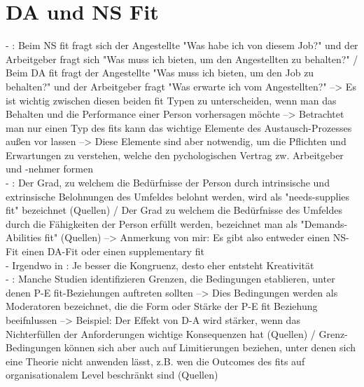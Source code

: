 \section{DA und NS Fit}
\label{ch:personEnvironmentFit:DAundNS}
- \cite[S. 3]{caplan:1987}: Beim NS fit fragt sich der Angestellte "Was habe ich von diesem Job?" und der Arbeitgeber fragt sich "Was muss ich bieten, um den Angestellten zu behalten?" / Beim DA fit fragt der Angestellte "Was muss ich bieten, um den Job zu behalten?" und der Arbeitgeber fragt "Was erwarte ich vom Angestellten?" --> Es ist wichtig zwischen diesen beiden fit Typen zu unterscheiden, wenn man das Behalten und die Performance einer Person vorhersagen möchte --> Betrachtet man nur einen Typ des fits kann das wichtige Elemente des Austausch-Prozesses außen vor lassen --> Diese Elemente sind aber notwendig, um die Pflichten und Erwartungen zu verstehen, welche den pychologischen Vertrag zw. Arbeitgeber und -nehmer formen \\
- \cite[S. 4]{edwards:2008}: Der Grad, zu welchem die Bedürfnisse der Person durch intrinsische und extrinsische Belohnungen des Umfeldes belohnt werden, wird als "needs-supplies fit" bezeichnet (Quellen) / Der Grad zu welchem die Bedürfnisse des Umfeldes durch die Fähigkeiten der Person erfüllt werden, bezeichnet man als "Demands-Abilities fit" (Quellen) --> Anmerkung von mir: Es gibt also entweder einen NS-Fit einen DA-Fit oder einen supplementary fit \\
- Irgendwo in \textcite{choi:2004}: Je besser die Kongruenz, desto eher entsteht Kreativität \\
- \cite[S. 6]{edwards:2008}: Manche Studien identifizieren Grenzen, die Bedingungen etablieren, unter denen P-E fit-Beziehungen auftreten sollten --> Dies Bedingungen werden als Moderatoren bezeichnet, die die Form oder Stärke der P-E fit Beziehung beeifnlussen --> Beispiel: Der Effekt von D-A wird stärker, wenn das Nichterfüllen der Anforderungen wichtige Konsequenzen hat (Quellen) / Grenz-Bedingungen können sich aber auch auf Limitierungen beziehen, unter denen sich eine Theorie nicht anwenden lässt, z.B. wen die Outcomes des fits auf organisationalem Level beschränkt sind (Quellen) \\
